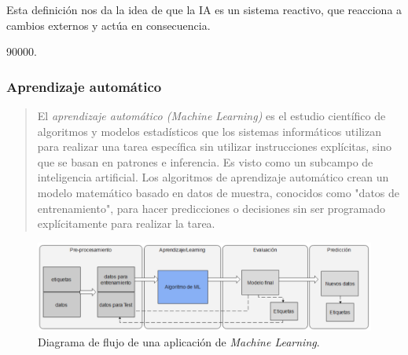 \documentclass[a4paper,12pt]{article}
\begin{document}
Esta definición nos da la idea de que la IA es un sistema reactivo, que reacciona a cambios externos y actúa en consecuencia.

90000.

\subsubsection{Aprendizaje automático} \label{machinelearning}

\begin{quote}
  El \textit{aprendizaje automático (Machine Learning)} es el estudio científico de algoritmos y modelos estadísticos que los sistemas informáticos utilizan para realizar una tarea específica sin utilizar instrucciones explícitas, sino que se basan en patrones e inferencia. Es visto como un subcampo de inteligencia artificial. Los algoritmos de aprendizaje automático crean un modelo matemático basado en datos de muestra, conocidos como "datos de entrenamiento", para hacer predicciones o decisiones sin ser programado explícitamente para realizar la tarea.
  
  \hfill \citet{bishop2006pattern}
\end{quote}


\begin{figure}[H]
	\begin{center}				
	\includegraphics[width=1\textwidth]{tesis_1.png}
  	\caption{Diagrama de flujo de una aplicación de \textit{Machine Learning}.}
  	\label{fig:flowchartml.}
  	\end{center}
\end{figure}
\end{document}
